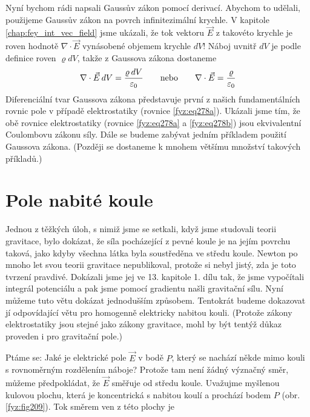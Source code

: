{    Nyní bychom rádi napsali Gaussův zákon pomocí derivací. Abychom to udělali, použijeme Gaussův 
    zákon na povrch infinitezimální krychle. V kapitole \ref{chap:fey_int_vec_field} jsme ukázali, 
    že tok vektoru \(\vec{E}\) z takovéto krychle je roven hodnotě \(\nabla\cdot\vec{E}\) 
    vynásobené objemem krychle \(dV\)! Náboj uvnitř \(dV\) je podle definice roven \(\varrho dV\), 
    takže z Gaussova zákona dostaneme
    \begin{equation}\label{fyz:fey_eq_elstat38}
     \nabla\cdot\vec{E}\hspace{2pt}dV = \frac{\varrho\hspace{2pt}dV}{\varepsilon_0} \qquad 
     \text{nebo} \qquad
     \nabla\cdot\vec{E}       = \frac{\varrho}{\varepsilon_0}
    \end{equation}
    Diferenciální tvar Gaussova zákona představuje první z našich fundamentálních rovnic pole v 
    případě elektrostatiky (rovnice \ref{fyz:eq278a}). Ukázali jsme tím, že obě rovnice 
    elektrostatiky (rovnice \ref{fyz:eq278a} a \ref{fyz:eq278b}) jsou 
    ekvivalentní Coulombovu zákonu síly. Dále se budeme zabývat jedním příkladem použití Gaussova 
    zákona. (Později se dostaneme k mnohem většímu množství takových příkladů.)
    
  \section{Pole nabité koule}\label{fyz:IIchapIVsecVII}
    \cite[s.~77]{Feynman02} Jednou z těžkých úloh, s nimiž jsme se setkali, když jsme studovali 
    teorii gravitace, bylo dokázat, že síla pocházející z pevné koule je na jejím povrchu taková, 
    jako kdyby všechna látka byla soustředěna ve středu koule. Newton po mnoho let svou teorii 
    gravitace nepublikoval, protože si nebyl jistý, zda je toto tvrzení pravdivé. Dokázali jsme jej 
    ve 13. kapitole 1. dílu tak, že jsme vypočítali integrál potenciálu a pak jsme pomocí gradientu 
    našli gravitační sílu. Nyní můžeme tuto větu dokázat jednodušším způsobem. Tentokrát budeme 
    dokazovat jí odpovídající větu pro homogenně elektricky nabitou kouli. (Protože zákony 
    elektrostatiky jsou stejné jako zákony gravitace, mohl by být tentýž důkaz proveden i pro 
    gravitační pole.)
    
    Ptáme se: Jaké je elektrické pole \(\vec{E}\) v bodě \(P\), který se nachází někde mimo kouli s 
    rovnoměrným rozdělením náboje? Protože tam není žádný význačný směr, můžeme předpokládat, že 
    \(\vec{E}\) směřuje od středu koule. Uvažujme myšlenou kulovou plochu, která je koncentrická s 
    nabitou koulí a prochází bodem \(P\) (obr. \ref{fyz:fig209}). Tok směrem ven z 
    této plochy je

}
